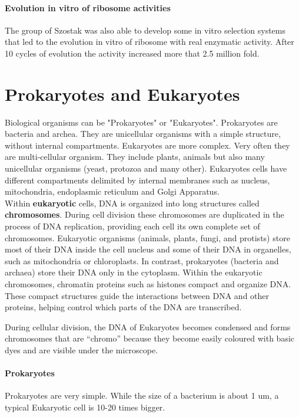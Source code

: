 \paragraph*{Evolution in vitro of ribosome activities}
The group of Szostak was also able to develop some in vitro selection systems
that led to the evolution in vitro of ribosome with real enzymatic activity.
After 10 cycles of evolution the activity increased more that 2.5 million fold.

\section{Prokaryotes and Eukaryotes}

Biological organisms can be "Prokaryotes" or "Eukaryotes". Prokaryotes are
bacteria and archea. They are unicellular organisms with a simple structure,
without internal compartments. Eukaryotes are more complex. Very often they are
multi-cellular organism. They include plants, animals but also many unicellular
organisms (yeast, protozoa and many other). Eukaryotes cells have different
compartments delimited by internal membranes such as nucleus, mitochondria,
endoplasmic reticulum and Golgi Apparatus.\\

Within \textbf{eukaryotic} cells, DNA is organized into long structures called 
\textbf{chromosomes}. 
During cell division these chromosomes are duplicated in the process of DNA 
replication, providing each cell its own complete set of chromosomes. 
Eukaryotic organisms (animals, plants, fungi, and protists) store most of 
their DNA inside the cell nucleus and some of their DNA in organelles, such as 
mitochondria or chloroplasts.
In contrast, prokaryotes (bacteria and archaea) store their DNA only in the 
cytoplasm. 
Within the eukaryotic chromosomes, chromatin proteins such as histones compact 
and organize DNA. 
These compact structures guide the interactions between DNA and other proteins, 
helping control which parts of the DNA are transcribed.

During cellular division, the DNA
of Eukaryotes becomes condensed and forms chromosomes that are ``chromo''
because they become easily coloured with basic dyes and are visible under the
microscope.

\paragraph*{Prokaryotes} Prokaryotes are very simple. While the size of a
bacterium is about 1 um, a typical Eukaryotic cell is 10-20 times bigger.

